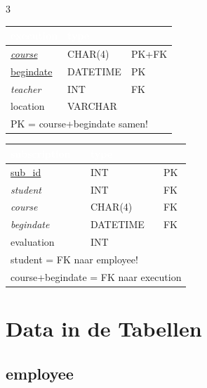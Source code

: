 \documentclass[10pt,a4paper]{article}
\newcommand{\TBLH}[1]{\textbf{\textcolor{white}{#1}}}
\begin{document}
\begin{multicols}{3}
{\scriptsize
\begin{tabular}{|l|l|l|}
\hline
\rowcolor{tblhead}\TBLH{execution} & \TBLH{type} & \TBLH{} \\ \hline
\underline{\textit{course}} & CHAR(4) & PK+FK \\ \hline
\underline{begindate} & DATETIME & PK \\ \hline
\textit{teacher} & INT & FK \\ \hline
location & VARCHAR & \\ \hline
\multicolumn{3}{|l|}{\tiny PK = course+begindate samen!} \\ \hline
\end{tabular}}

\columnbreak

{\scriptsize
\begin{tabular}{|l|l|l|}
\hline
\rowcolor{tblhead}\TBLH{subscription} & \TBLH{type} & \TBLH{} \\ \hline
\underline{sub\_id} & INT & PK \\ \hline
\textit{student} & INT & FK \\ \hline
\textit{course} & CHAR(4) & FK \\ \hline
\textit{begindate} & DATETIME & FK \\ \hline
evaluation & INT & \\ \hline
\multicolumn{3}{|l|}{\tiny student = FK naar employee!} \\ \hline
\multicolumn{3}{|l|}{\tiny course+begindate = FK naar execution} \\ \hline
\end{tabular}}
\end{multicols}

\section{Data in de Tabellen}

\subsection{employee}
\end{document}
